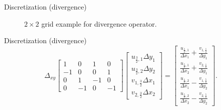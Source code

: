 \documentclass{beamer}
\begin{document}
	\begin{frame}{Discretization (divergence)}
	\begin{figure}[H] %
	  \caption{$2\times 2$ grid example for divergence operator.}\label{fig:D-example-2x2}
	\end{figure}	
	\end{frame}
	
	\begin{frame}{Discretization (divergence)}
	\begin{equation}\label{eqn:divergence-matrix}
	\Delta_{xy}\left[\begin{array}{rrrrrr}
	1  & 0  & 1 & 0 \\
	-1  & 0  & 0 & 1 \\
	0  & 1  & -1 & 0 \\
	0  & -1  & 0 & -1
	\end{array}\right]\left[\begin{array}{l}
	u_{\frac{3}{2},1} \Delta y_1 \\
	u_{\frac{3}{2},2} \Delta y_2 \\
	v_{1,\frac{3}{2}} \Delta x_1 \\
	v_{2,\frac{3}{2}} \Delta x_2
	\end{array}\right]=
	\begin{bmatrix}{}
	\frac{u_{\frac{1}{2},1}}{\Delta x_1}+\frac{v_{1,\frac{1}{2}}}{\Delta y_1} \\
	\frac{u_{\frac{5}{2},1}}{\Delta x_2}+\frac{v_{2,\frac{1}{2}}}{\Delta y_1} \\
	\frac{u_{\frac{1}{2},2}}{\Delta x_1}-\frac{v_{1,\frac{5}{2}}}{\Delta y_2} \\
	\frac{u_{\frac{5}{2},2}}{\Delta x_2}-\frac{v_{2,\frac{5}{2}}}{\Delta y_2}
	\end{bmatrix}.
	\end{equation}
	\end{frame}
	
\end{document}
